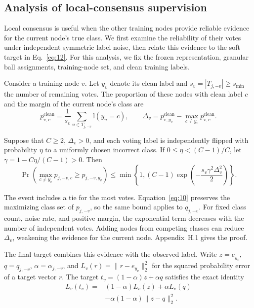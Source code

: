 \subsection{Analysis of local-consensus supervision}\label{sec:3.4}

Local consensus is useful when the other training nodes provide reliable evidence for the current node's true class. We first examine the reliability of their votes under independent symmetric label noise, then relate this evidence to the soft target in Eq.~\eqref{eq:12}. For this analysis, we fix the frozen representation, granular ball assignments, training-node set, and clean training labels.

Consider a training node \(v\). Let \(y_v\) denote its clean label and \(s_v=|T_{j,-v}|\geq s_{\min}\) the number of remaining votes. The proportion of these nodes with clean label \(c\) and the margin of the current node's class are
\begin{equation}\label{eq:14}
p^{\mathrm{clean}}_{v,c}=\frac{1}{s_v}\sum_{u\in T_{j,-v}}\mathbb{I}(y_u=c),
\qquad
\Delta_v=p^{\mathrm{clean}}_{v,y_v}-\max_{c\ne y_v}p^{\mathrm{clean}}_{v,c}.
\end{equation}

\begin{proposition}\label{prop:local_vote}
Suppose that \(C\geq2\), \(\Delta_v>0\), and each voting label is independently flipped with probability \(\eta\) to a uniformly chosen incorrect class. If \(0\leq\eta<(C-1)/C\), let \(\gamma=1-C\eta/(C-1)>0\). Then
\begin{equation}\label{eq:15}
\Pr\!\left(\max_{c\ne y_v}p_{j,-v,c}\geq p_{j,-v,y_v}\right)
\leq \min\!\left\{1,(C-1)\exp\!\left(-\frac{s_v\gamma^2\Delta_v^2}{2}\right)\right\}.
\end{equation}
\end{proposition}

The event includes a tie for the most votes. Equation~\eqref{eq:10} preserves the maximizing class set of \(p_{j,-v}\), so the same bound applies to \(q_{j,-v}\). For fixed class count, noise rate, and positive margin, the exponential term decreases with the number of independent votes. Adding nodes from competing classes can reduce \(\Delta_v\), weakening the evidence for the current node. Appendix~H.1 gives the proof.

The final target combines this evidence with the observed label. Write \(z=e_{\widetilde y_v}\), \(q=q_{j,-v}\), \(\alpha=\alpha_{j,-v}\), and \(L_v(r)=\lVert r-e_{y_v}\rVert_2^2\) for the squared probability error of a target vector \(r\). The target \(t_v=(1-\alpha)z+\alpha q\) satisfies the exact identity
\begin{equation}\label{eq:16}
\begin{aligned}
L_v(t_v)={}&(1-\alpha)L_v(z)+\alpha L_v(q)\\
&-\alpha(1-\alpha)\lVert z-q\rVert_2^2.
\end{aligned}
\end{equation}

